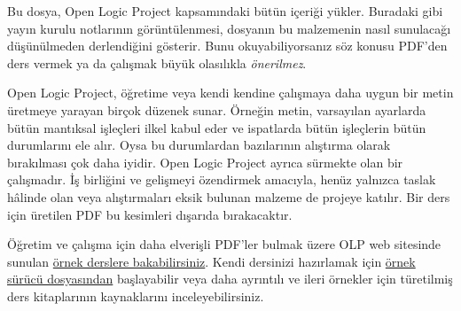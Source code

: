 \documentclass[../include/open-logic-part]{subfiles}
\begin{document}
\clearpage

\begin{editorial}
Bu dosya, Open Logic Project kapsamındaki bütün içeriği yükler. Buradaki gibi
yayın kurulu notlarının görüntülenmesi, dosyanın bu malzemenin nasıl sunulacağı
düşünülmeden derlendiğini gösterir. Bunu okuyabiliyorsanız söz konusu PDF'den
ders vermek ya da çalışmak büyük olasılıkla \emph{önerilmez}.

Open Logic Project, öğretime veya kendi kendine çalışmaya daha uygun bir metin üretmeye
yarayan birçok düzenek sunar. Örneğin metin, varsayılan ayarlarda bütün
mantıksal işleçleri ilkel kabul eder ve ispatlarda bütün işleçlerin bütün
durumlarını ele alır. Oysa bu durumlardan bazılarının alıştırma olarak
bırakılması çok daha iyidir. Open Logic Project ayrıca sürmekte olan bir
çalışmadır. İş birliğini ve gelişmeyi özendirmek amacıyla, henüz yalnızca taslak
hâlinde olan veya alıştırmaları eksik bulunan malzeme de projeye katılır. Bir
ders için üretilen PDF bu kesimleri dışarıda bırakacaktır.

Öğretim ve çalışma için daha elverişli PDF'ler bulmak üzere OLP web sitesinde
sunulan
\href{http://builds.openlogicproject.org/}{örnek derslere bakabilirsiniz}.
Kendi dersinizi hazırlamak için
\href{https://github.com/OpenLogicProject/OpenLogic/tree/master/courses/sample}{örnek
  sürücü dosyasından} başlayabilir veya daha ayrıntılı ve ileri örnekler için
türetilmiş ders kitaplarının kaynaklarını inceleyebilirsiniz.
\end{editorial}


















\end{document}

